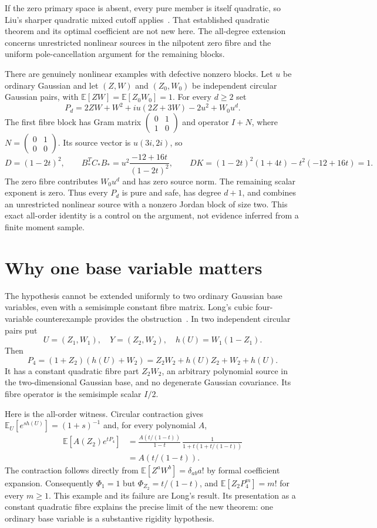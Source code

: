 \documentclass[11pt]{article}
\theoremstyle{definition}\newtheorem{definition}[theorem]{Definition}
\theoremstyle{remark}\newtheorem{remark}[theorem]{Remark}
\newcommand{\E}{\mathbb E}
\begin{document}
If the zero primary space is absent, every pure member is
itself quadratic, so Liu's sharper quadratic mixed cutoff
applies~\cite[Theorems~2.1 and~2.2]{Liu}. That established
quadratic theorem and its optimal coefficient are not new here.
The all-degree extension concerns unrestricted nonlinear sources
in the nilpotent zero fibre and the uniform pole-cancellation
argument for the remaining blocks.

There are genuinely nonlinear examples with defective nonzero
blocks. Let $u$ be ordinary Gaussian and let $(Z,W)$ and
$(Z_0,W_0)$ be independent circular Gaussian pairs, with
$\E[ZW]=\E[Z_0W_0]=1$. For every $d\ge2$ set
\[
 P_d=2ZW+W^2+iu(2Z+3W)-2u^2+W_0u^d.
\]
The first fibre block has Gram matrix
$\left(\begin{smallmatrix}0&1\\1&0\end{smallmatrix}\right)$
and operator $I+N$, where
$N=\left(\begin{smallmatrix}0&1\\0&0\end{smallmatrix}\right)$.
Its source vector is $u(3i,2i)$, so
\[
 D=(1-2t)^2,\qquad
 B_*^TC_*B_*=u^2\frac{-12+16t}{(1-2t)^2},\qquad
 DK=(1-2t)^2(1+4t)-t^2(-12+16t)=1.
\]
The zero fibre contributes $W_0u^d$ and has zero source norm.
The remaining scalar exponent is zero. Thus every $P_d$ is
pure and safe, has degree $d+1$, and combines an unrestricted
nonlinear source with a nonzero Jordan block of size two.
This exact all-order identity is a control on the argument,
not evidence inferred from a finite moment sample.

\section{Why one base variable matters}

The hypothesis cannot be extended uniformly to two ordinary
Gaussian base variables, even with a semisimple constant fibre
matrix. Long's cubic four-variable counterexample provides the
obstruction~\cite[Proposition~4.1]{Long}. In two independent
circular pairs put
\[
 U=(Z_1,W_1),\quad Y=(Z_2,W_2),\quad h(U)=W_1(1-Z_1).
\]
Then
\[
 P_4=(1+Z_2)(h(U)+W_2)
     =Z_2W_2+h(U)Z_2+W_2+h(U).
\]
It has a constant quadratic fibre part $Z_2W_2$, an arbitrary
polynomial source in the two-dimensional Gaussian base, and
no degenerate Gaussian covariance. Its fibre operator is the
semisimple scalar $I/2$.

Here is the all-order witness. Circular contraction gives
$\E_{U}[e^{s h(U)}]=(1+s)^{-1}$ and, for every polynomial $A$,
\begin{align*}
 \E[A(Z_2)e^{tP_4}]
 &=\frac{A(t/(1-t))}{1-t}\,
       \frac1{1+t(1+t/(1-t))}\\
 &=A(t/(1-t)).
\end{align*}
The contraction follows directly from
$\E[Z^aW^b]=\delta_{ab}a!$ by formal coefficient expansion.
Consequently $\Phi_1=1$ but $\Phi_{Z_2}=t/(1-t)$, and
$\E[Z_2P_4^m]=m!$ for every $m\ge1$. This example and its
failure are Long's result. Its presentation as a constant
quadratic fibre explains the precise limit of the new theorem:
one ordinary base variable is a substantive rigidity hypothesis.
\end{document}
